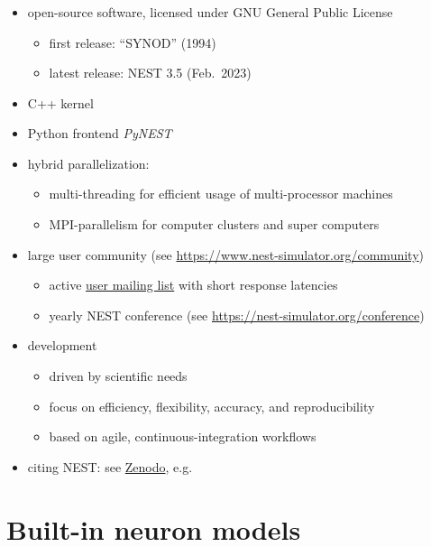 \documentclass[8pt,t,usepdftitle=false]{beamer}
\begin{document}
\begin{frame}[t,plain]
  \frametitle{\ttl}
  \begin{itemize}\itemsep2ex
  \item<1-> open-source software, licensed under GNU General Public License
    \begin{itemize}
    \item first release: ``SYNOD'' (1994)
    \item latest release: NEST 3.5 (Feb.~2023)
    \end{itemize}
  \item<2-> C++ kernel
  \item<2-> Python frontend \emph{PyNEST}
  \item<3-> hybrid parallelization:
    \begin{itemize}
    \item multi-threading for efficient usage of multi-processor machines
    \item MPI-parallelism for computer clusters and super computers 
    \end{itemize}
  \item<4-> large user community {\tiny (see \url{https://www.nest-simulator.org/community})}
    \begin{itemize}
    \item active \href{https://www.nest-simulator.org/mailinglist/postorius/lists/users.nest-simulator.org/}{user mailing list} with short response latencies
    \item yearly NEST conference {\tiny (see \url{https://nest-simulator.org/conference})}
    \end{itemize}
  \item<5-> development
    \begin{itemize}
    \item driven by scientific needs
    \item focus on efficiency, flexibility, accuracy, and reproducibility
    \item based on agile, continuous-integration workflows
    \end{itemize}
  \item<6-> citing NEST: see
    \href{https://zenodo.org/search?page=1&size=20&q=title:NEST\%20AND\%20-description:graphical&file_type=gz&sort=-publication_date}{Zenodo}, e.g.~\parencite{Nest340}    
  \end{itemize}    
\end{frame}
\def\ttl{Built-in neuron models}\section{\ttl}
\end{document}
